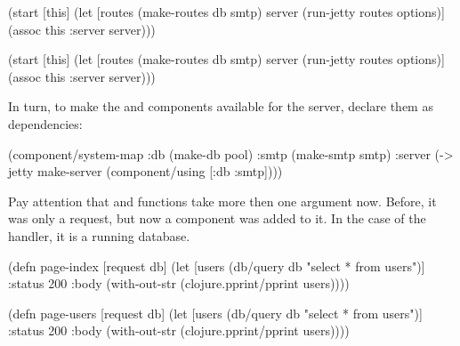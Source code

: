 \begin{english}
  \begin{clojure}
(start [this]
  (let [routes (make-routes db smtp)
        server (run-jetty
                 routes options)]
    (assoc this :server server)))
  \end{clojure}
\end{english}

\else

\begin{english}
  \begin{clojure}
(start [this]
  (let [routes (make-routes db smtp)
        server (run-jetty routes options)]
    (assoc this :server server)))
  \end{clojure}
\end{english}

\fi

In turn, to make the  and  components available for the server, declare them as dependencies:

\begin{english}
  \begin{clojure}
(component/system-map
 :db   (make-db pool)
 :smtp (make-smtp smtp)
 :server
 (-> jetty
     make-server
     (component/using [:db :smtp])))
  \end{clojure}
\end{english}

Pay attention that  and  functions take more then one argument now. Before, it was only a request, but now a component was added to it. In the case of the  handler, it is a running database.

\ifnarrow

\begin{english}
  \begin{clojure}
(defn page-index
  [request db]
  (let [users (db/query db
                "select * from users")]
    {:status 200
     :body (with-out-str
             (clojure.pprint/pprint
               users))}))
  \end{clojure}
\end{english}

\else

\begin{english}
  \begin{clojure}
(defn page-users
  [request db]
  (let [users (db/query db "select * from users")]
    {:status 200
     :body (with-out-str
             (clojure.pprint/pprint users))}))
  \end{clojure}
\end{english}


